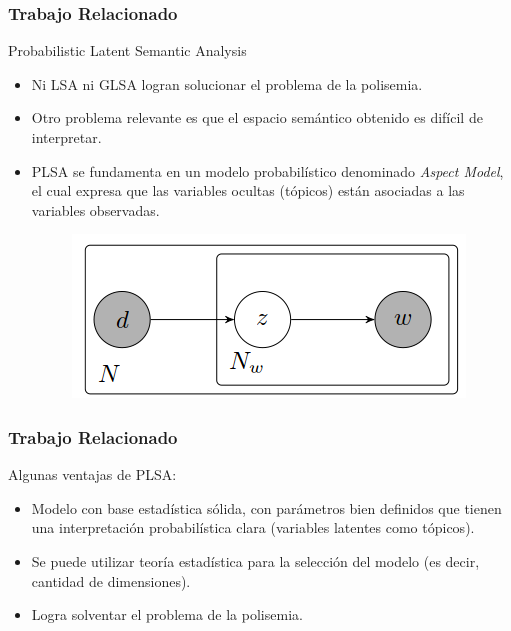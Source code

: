 \documentclass{beamer}
\begin{document}

\begin{frame}
\frametitle{Trabajo Relacionado}

Probabilistic Latent Semantic Analysis
\begin{itemize}
\item Ni LSA ni GLSA logran solucionar el problema de la polisemia.
\item Otro problema relevante es que el espacio semántico obtenido es difícil de interpretar.
\item PLSA se fundamenta en un modelo probabilístico denominado {\em Aspect Model}, el cual expresa que las variables ocultas (tópicos) están asociadas a las variables observadas.

\begin{figure}
\includegraphics[width=0.5\linewidth]{../figure_plsa.png}
\end{figure}
\end{itemize}

\end{frame}


\begin{frame}
\frametitle{Trabajo Relacionado}

Algunas ventajas de PLSA:
\begin{itemize}
\item Modelo con base estadística sólida, con parámetros bien definidos que tienen una interpretación probabilística clara (variables latentes como tópicos).
\item Se puede utilizar teoría estadística para la selección del modelo (es decir, cantidad de dimensiones).
\item Logra solventar el problema de la polisemia.

\end{itemize}
\end{frame}

\end{document}
